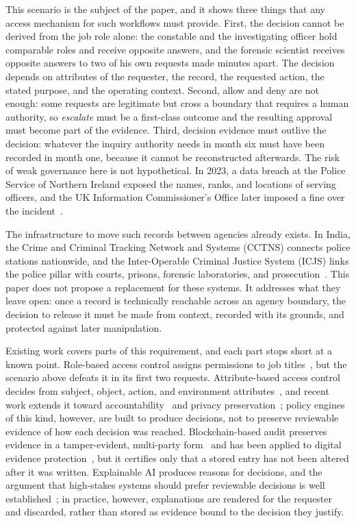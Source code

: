 This scenario is the subject of the paper, and it shows three things that any
access mechanism for such workflows must provide. First, the decision cannot be
derived from the job role alone: the constable and the investigating officer
hold comparable roles and receive opposite answers, and the forensic scientist
receives opposite answers to two of his own requests made minutes apart. The
decision depends on attributes of the requester, the record, the requested
action, the stated purpose, and the operating context. Second, allow and deny
are not enough: some requests are legitimate but cross a boundary that requires
a human authority, so \emph{escalate} must be a first-class outcome and the
resulting approval must become part of the evidence. Third, decision evidence
must outlive the decision: whatever the inquiry authority needs in month six
must have been recorded in month one, because it cannot be reconstructed
afterwards. The risk of weak governance here is not hypothetical. In 2023, a
data breach at the Police Service of Northern Ireland exposed the names, ranks,
and locations of serving officers, and the UK Information Commissioner's Office
later imposed a fine over the
incident~\cite{guardian_psni_breach_2023,ico_psni_fine_2024}.

The infrastructure to move such records between agencies already exists. In
India, the Crime and Criminal Tracking Network and Systems (CCTNS) connects
police stations nationwide, and the Inter-Operable Criminal Justice System
(ICJS) links the police pillar with courts, prisons, forensic laboratories, and
prosecution~\cite{pib_cctns_2026,mha_icjs_2026}. This paper does not propose a
replacement for these systems. It addresses what they leave open: once a record
is technically reachable across an agency boundary, the decision to release it
must be made from context, recorded with its grounds, and protected against
later manipulation.

Existing work covers parts of this requirement, and each part stops short at a
known point. Role-based access control assigns permissions to job
titles~\cite{sandhu_rbac_1996}, but the scenario above defeats it in its first
two requests. Attribute-based access control decides from subject, object,
action, and environment attributes~\cite{nist_abac_2014}, and recent work
extends it toward accountability~\cite{hu_accountable_private_ac_2024} and
privacy preservation~\cite{kerl_privacy_abac_2025}; policy engines of this kind,
however, are built to produce decisions, not to preserve reviewable evidence of
how each decision was reached. Blockchain-based audit preserves evidence in a
tamper-evident, multi-party
form~\cite{nist_blockchain_access_2022,androulaki_fabric_2018} and has been
applied to digital evidence
protection~\cite{banerjee_dashdikpala_2026,anbarasi_ai_criminal_justice_2026},
but it certifies only that a stored entry has not been altered after it was
written. Explainable AI produces reasons for decisions, and the argument that
high-stakes systems should prefer reviewable decisions is well
established~\cite{rudin_2019,zocholl_xai_law_enforcement_2025}; in practice,
however, explanations are rendered for the requester and discarded, rather than
stored as evidence bound to the decision they justify.

